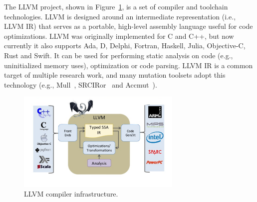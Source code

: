 
The LLVM project, shown in Figure~\ref{fig:compileTime:llvm}, is a set of compiler and toolchain technologies. LLVM is designed around an intermediate representation (i.e., LLVM IR) that serves as a portable, high-level assembly language useful for code optimizations. LLVM was originally implemented for C and C++, but now currently it also supports Ada, D, Delphi, Fortran, Haskell, Julia, Objective-C, Rust and Swift. It can be used for performing static analysis on code (e.g., uninitialized memory uses), optimization or code parsing.
LLVM IR is a common target of multiple research work, and many mutation toolsets adopt this technology (e.g., Mull~\cite{denisov2018mull}, SRCIRor~\cite{hariri2018srciror,hariri2019comparing} and Accmut~\cite{wang2017faster}).

	\begin{figure}
	\centering
		\includegraphics[width=0.7\textwidth]{images/llvm}
		\caption{LLVM compiler infrastructure.}
		\label{fig:compileTime:llvm}
	\end{figure}







